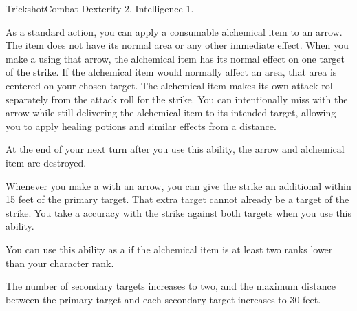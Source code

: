   \begin{feat}{Trickshot}{Combat}
    \featpre Dexterity 2, Intelligence 1.

     As a standard action, you can apply a consumable alchemical item to an arrow.
    The item does not have its normal area or any other immediate effect.
    When you make a  using that arrow, the alchemical item has its normal effect on one target of the strike.
    If the alchemical item would normally affect an area, that area is centered on your chosen target.
    The alchemical item makes its own attack roll separately from the attack roll for the strike.
    You can intentionally miss with the arrow while still delivering the alchemical item to its intended target, allowing you to apply healing potions and similar effects from a distance.

    At the end of your next turn after you use this ability, the arrow and alchemical item are destroyed.

     Whenever you make a  with an arrow, you can give the strike an additional  within 15 feet of the primary target.
    That extra target cannot already be a target of the strike.
    You take a  accuracy with the strike against both targets when you use this ability.

     You can use this ability as a  if the alchemical item is at least two ranks lower than your character rank.

     The number of secondary targets increases to two, and the maximum distance between the primary target and each secondary target increases to 30 feet.
  \end{feat}

